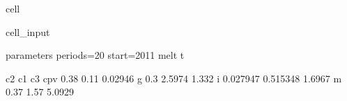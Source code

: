 \documentclass[letterpaper,10pt,english]{jupyterBook}
\begin{document}
\begin{sphinxuseclass}{cell}\begin{sphinxVerbatimInput}

\begin{sphinxuseclass}{cell_input}
\begin{sphinxVerbatim}[commandchars=\\\{\}]
 parameters   periods=20 start=2011 melt t 

      c2      c1      c3 
cpv   0.38 \PYGZhy{}0.11 0.02946
g     0.3 \PYGZhy{}2.5974  1.332   
i     0.027947 \PYGZhy{}0.515348 1.6967
m     0.37  \PYGZhy{}1.57 5.0929 
\end{sphinxVerbatim}

\end{sphinxuseclass}\end{sphinxVerbatimInput}

\end{sphinxuseclass}
\end{document}

